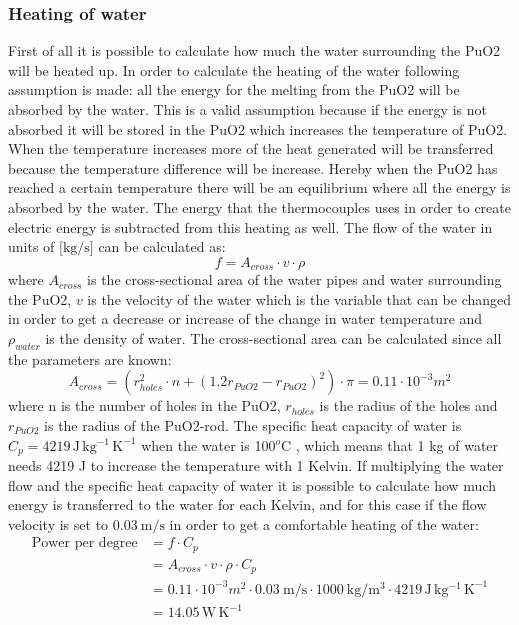 \subsubsection{Heating of water}
First of all it is possible to calculate how much the water surrounding the PuO2 will be heated up. In order to calculate the heating of the water following assumption is made: all the energy for the melting from the PuO2 will be absorbed by the water. This is a valid assumption because if the energy is not absorbed it will be stored in the PuO2 which increases the temperature of PuO2. When the temperature increases more of the heat generated will be transferred because the temperature difference will be increase. Hereby when the PuO2 has reached a certain temperature there will be an equilibrium where all the energy is absorbed by the water. The energy that the thermocouples uses in order to create electric energy is subtracted from this heating as well.
The flow of the water in units of $\text{[kg/s]}$ can be calculated as: 
\begin{equation}
f = A_{cross} \cdot v \cdot \rho
\end{equation}
where $A_{cross}$ is the cross-sectional area of the water pipes and water surrounding the PuO2, $v$ is the velocity of the water which is the variable that can be changed in order to get a decrease or increase of the change in water temperature and $\rho_{water}$ is the density of water. The cross-sectional area can be calculated since all the parameters are known: 
\begin{equation}
A_{cross} = \left(r_{holes}^2 \cdot n + \left(1.2r_{PuO2}-r_{PuO2}\right) ^2 \right) \cdot \pi = 0.11 \cdot 10^{-3} m^2
\end{equation}
where n is the number of holes in the PuO2, $r_{holes}$ is the radius of the holes and $r_{PuO2}$ is the radius of the PuO2-rod.  The specific heat capacity of water is $C_p = 4219 \, \mathrm{J \, kg^{-1} \, K^{-1}}$ when the water is 100$^o$C \cite{website:water_dens}, which means that 1 kg of water needs 4219 J to increase the temperature with 1 Kelvin. If multiplying the water flow and the specific heat capacity of water it is possible to calculate how much energy is transferred to the water for each Kelvin, and for this case if the flow velocity is set to $\SI{0.03}{\metre\per\second}$ in order to get a comfortable heating of the water: 
\begin{equation}\label{eq:waterheating}
\begin{aligned}
\text{Power per degree} & ={} f \cdot C_p \\
& = A_{cross} \cdot v \cdot \rho \cdot C_p \\
& = 0.11\cdot 10^{-3} m^2 \cdot \SI{0.03}{\metre\per\second} \cdot \SI{1000}{\kilo\gram\per\cubic\metre} \cdot 4219 \, \mathrm{J \, kg^{-1} \, K^{-1}} \\
& = 14.05 \, \mathrm{W \, K^{-1}}
\end{aligned}
\end{equation}

